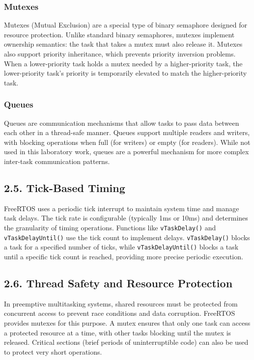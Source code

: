 \documentclass[12pt]{article}
\begin{document}
\subsubsection*{Mutexes}

Mutexes (Mutual Exclusion) are a special type of binary semaphore designed for resource protection. Unlike standard binary semaphores, mutexes implement ownership semantics: the task that takes a mutex must also release it. Mutexes also support priority inheritance, which prevents priority inversion problems. When a lower-priority task holds a mutex needed by a higher-priority task, the lower-priority task's priority is temporarily elevated to match the higher-priority task.

\subsubsection*{Queues}

Queues are communication mechanisms that allow tasks to pass data between each other in a thread-safe manner. Queues support multiple readers and writers, with blocking operations when full (for writers) or empty (for readers). While not used in this laboratory work, queues are a powerful mechanism for more complex inter-task communication patterns.

\subsection*{2.5. Tick-Based Timing}

FreeRTOS uses a periodic tick interrupt to maintain system time and manage task delays. The tick rate is configurable (typically 1ms or 10ms) and determines the granularity of timing operations. Functions like \texttt{vTaskDelay()} and \texttt{vTaskDelayUntil()} use the tick count to implement delays. \texttt{vTaskDelay()} blocks a task for a specified number of ticks, while \texttt{vTaskDelayUntil()} blocks a task until a specific tick count is reached, providing more precise periodic execution.

\subsection*{2.6. Thread Safety and Resource Protection}

In preemptive multitasking systems, shared resources must be protected from concurrent access to prevent race conditions and data corruption. FreeRTOS provides mutexes for this purpose. A mutex ensures that only one task can access a protected resource at a time, with other tasks blocking until the mutex is released. Critical sections (brief periods of uninterruptible code) can also be used to protect very short operations.
\end{document}
